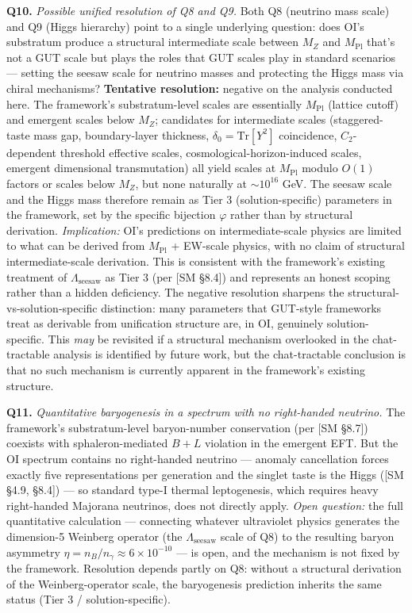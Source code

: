 \documentclass[
]{article}
\begin{document}
\textbf{Q10.} \emph{Possible unified resolution of Q8 and Q9.} Both Q8
(neutrino mass scale) and Q9 (Higgs hierarchy) point to a single
underlying question: does OI's substratum produce a structural
intermediate scale between \(M_Z\) and \(M_{\mathrm{Pl}}\) that's not a
GUT scale but plays the roles that GUT scales play in standard scenarios
--- setting the seesaw scale for neutrino masses and protecting the
Higgs mass via chiral mechanisms? \textbf{Tentative resolution:}
negative on the analysis conducted here. The framework's
substratum-level scales are essentially \(M_{\mathrm{Pl}}\) (lattice
cutoff) and emergent scales below \(M_Z\); candidates for intermediate
scales (staggered-taste mass gap, boundary-layer thickness,
\(\delta_0 = \mathrm{Tr}[Y^2]\) coincidence, \(C_2\)-dependent threshold
effective scales, cosmological-horizon-induced scales, emergent
dimensional transmutation) all yield scales at \(M_{\mathrm{Pl}}\)
modulo \(O(1)\) factors or scales below \(M_Z\), but none naturally at
\(\sim 10^{16}\) GeV. The seesaw scale and the Higgs mass therefore
remain as Tier 3 (solution-specific) parameters in the framework, set by
the specific bijection \(\varphi\) rather than by structural derivation.
\emph{Implication:} OI's predictions on intermediate-scale physics are
limited to what can be derived from \(M_{\mathrm{Pl}}\) + EW-scale
physics, with no claim of structural intermediate-scale derivation. This
is consistent with the framework's existing treatment of
\(\Lambda_{\mathrm{seesaw}}\) as Tier 3 (per {[}SM §8.4{]}) and
represents an honest scoping rather than a hidden deficiency. The
negative resolution sharpens the structural-vs-solution-specific
distinction: many parameters that GUT-style frameworks treat as
derivable from unification structure are, in OI, genuinely
solution-specific. This \emph{may} be revisited if a structural
mechanism overlooked in the chat-tractable analysis is identified by
future work, but the chat-tractable conclusion is that no such mechanism
is currently apparent in the framework's existing structure.

\textbf{Q11.} \emph{Quantitative baryogenesis in a spectrum with no
right-handed neutrino.} The framework's substratum-level baryon-number
conservation (per {[}SM §8.7{]}) coexists with sphaleron-mediated
\(B+L\) violation in the emergent EFT. But the OI spectrum contains no
right-handed neutrino --- anomaly cancellation forces exactly five
representations per generation and the singlet taste is the Higgs ({[}SM
§4.9, §8.4{]}) --- so standard type-I thermal leptogenesis, which
requires heavy right-handed Majorana neutrinos, does not directly apply.
\emph{Open question:} the full quantitative calculation --- connecting
whatever ultraviolet physics generates the dimension-5 Weinberg operator
(the \(\Lambda_{\mathrm{seesaw}}\) scale of Q8) to the resulting baryon
asymmetry \(\eta = n_B/n_\gamma \approx 6 \times 10^{-10}\) --- is open,
and the mechanism is not fixed by the framework. Resolution depends
partly on Q8: without a structural derivation of the Weinberg-operator
scale, the baryogenesis prediction inherits the same status (Tier 3 /
solution-specific).
\end{document}
